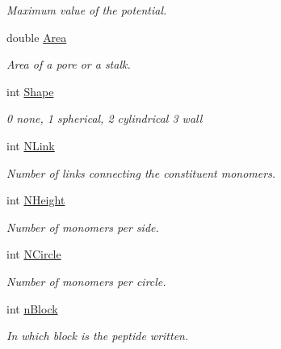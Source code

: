 \begin{DoxyCompactItemize}
\begin{DoxyCompactList}\small\item\em Maximum value of the potential. \end{DoxyCompactList}\item 
double \hyperlink{structNANO_acedb30173c5224396eb7a95709f5c619}{Area}\hypertarget{structNANO_acedb30173c5224396eb7a95709f5c619}{}\label{structNANO_acedb30173c5224396eb7a95709f5c619}

\begin{DoxyCompactList}\small\item\em Area of a pore or a stalk. \end{DoxyCompactList}\item 
int \hyperlink{structNANO_ae10d368b167a39a5905e047ba7083b2a}{Shape}\hypertarget{structNANO_ae10d368b167a39a5905e047ba7083b2a}{}\label{structNANO_ae10d368b167a39a5905e047ba7083b2a}

\begin{DoxyCompactList}\small\item\em 0 none, 1 spherical, 2 cylindrical 3 wall \end{DoxyCompactList}\item 
int \hyperlink{structNANO_a73918a2decc99bcf2317d2855dada6c8}{N\+Link}\hypertarget{structNANO_a73918a2decc99bcf2317d2855dada6c8}{}\label{structNANO_a73918a2decc99bcf2317d2855dada6c8}

\begin{DoxyCompactList}\small\item\em Number of links connecting the constituent monomers. \end{DoxyCompactList}\item 
int \hyperlink{structNANO_a03b74f589ea1f823e1a80cf00b6dde33}{N\+Height}\hypertarget{structNANO_a03b74f589ea1f823e1a80cf00b6dde33}{}\label{structNANO_a03b74f589ea1f823e1a80cf00b6dde33}

\begin{DoxyCompactList}\small\item\em Number of monomers per side. \end{DoxyCompactList}\item 
int \hyperlink{structNANO_a74ded76c210b56e54322eeeb9be4dc6e}{N\+Circle}\hypertarget{structNANO_a74ded76c210b56e54322eeeb9be4dc6e}{}\label{structNANO_a74ded76c210b56e54322eeeb9be4dc6e}

\begin{DoxyCompactList}\small\item\em Number of monomers per circle. \end{DoxyCompactList}\item 
int \hyperlink{structNANO_a41bd38e6447756bd59b0f61559fa57ce}{n\+Block}\hypertarget{structNANO_a41bd38e6447756bd59b0f61559fa57ce}{}\label{structNANO_a41bd38e6447756bd59b0f61559fa57ce}

\begin{DoxyCompactList}\small\item\em In which block is the peptide written. \end{DoxyCompactList}\end{DoxyCompactItemize}


